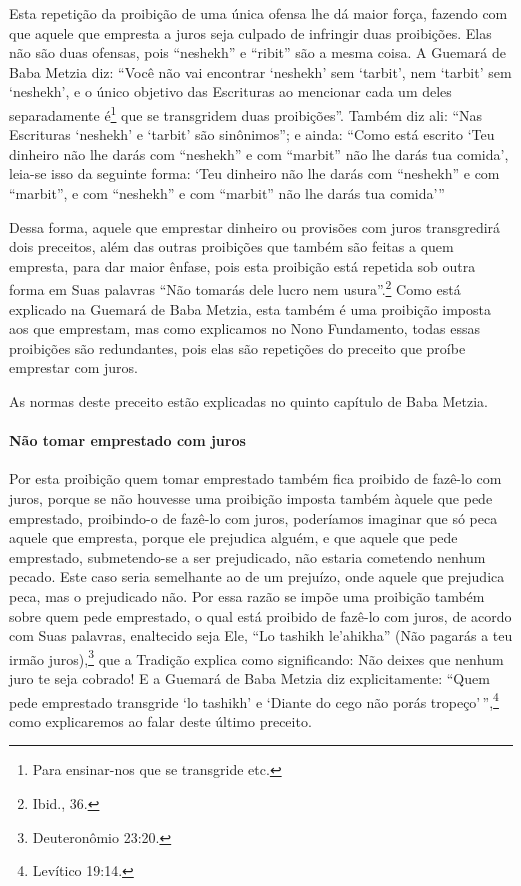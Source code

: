 Esta repetição da proibição de uma única ofensa lhe dá maior força,
fazendo com que aquele que empresta a juros seja culpado de infringir
duas proibições. Elas não são duas ofensas, pois ``neshekh'' e ``ribit''
são a mesma coisa. A Guemará de Baba Metzia diz: ``Você não vai
encontrar `neshekh' sem `tarbit', nem `tarbit' sem `neshekh', e o único
objetivo das Escrituras ao mencionar cada um deles separadamente
é\footnote{Para ensinar-nos que se transgride etc.} que se transgridem duas proibições''. Também diz
ali: ``Nas Escrituras `neshekh' e `tarbit' são sinônimos''; e ainda:
``Como está escrito `Teu dinheiro não lhe darás com ``neshekh'' e com
``marbit'' não lhe darás tua comida', leia-se isso da seguinte forma:
`Teu dinheiro não lhe darás com ``neshekh'' e com ``marbit'', e com
``neshekh'' e com ``marbit'' não lhe darás tua comida'''

Dessa forma, aquele que emprestar dinheiro ou provisões com juros
transgredirá dois preceitos, além das outras proibições que também são
feitas a quem empresta, para dar maior ênfase, pois esta proibição está
repetida sob outra forma em Suas palavras ``Não tomarás dele lucro nem
usura''.\footnote{Ibid., 36.} Como está explicado na Guemará de Baba Metzia, esta
também é uma proibição imposta aos que emprestam, mas como explicamos
no Nono Fundamento, todas essas proibições são redundantes, pois elas
são repetições do preceito que proíbe emprestar com juros.

As normas deste preceito estão explicadas no quinto capítulo de Baba Metzia.

\paragraph{Não tomar emprestado com juros}

Por esta proibição quem tomar emprestado também fica proibido de fazê-lo
com juros, porque se não houvesse uma proibição imposta também àquele
que pede emprestado, proibindo-o de fazê-lo com juros, poderíamos
imaginar que só peca aquele que empresta, porque ele prejudica alguém, e
que aquele que pede emprestado, submetendo-se a ser prejudicado, não
estaria cometendo nenhum pecado. Este caso seria semelhante ao de um
prejuízo, onde aquele que prejudica peca, mas o prejudicado não. Por
essa razão se impõe uma proibição também sobre quem pede emprestado, o
qual está proibido de fazê-lo com juros, de acordo com Suas palavras,
enaltecido seja Ele, ``Lo tashikh le'ahikha'' (Não pagarás a teu irmão
juros),\footnote{Deuteronômio 23:20.} que a Tradição explica como significando:
Não deixes que nenhum juro te seja cobrado! E a Guemará de Baba Metzia
diz explicitamente: ``Quem pede emprestado transgride `lo tashikh' e
`Diante do cego não porás tropeço'\,'',\footnote{Levítico 19:14.} como explicaremos
ao falar deste último preceito.

